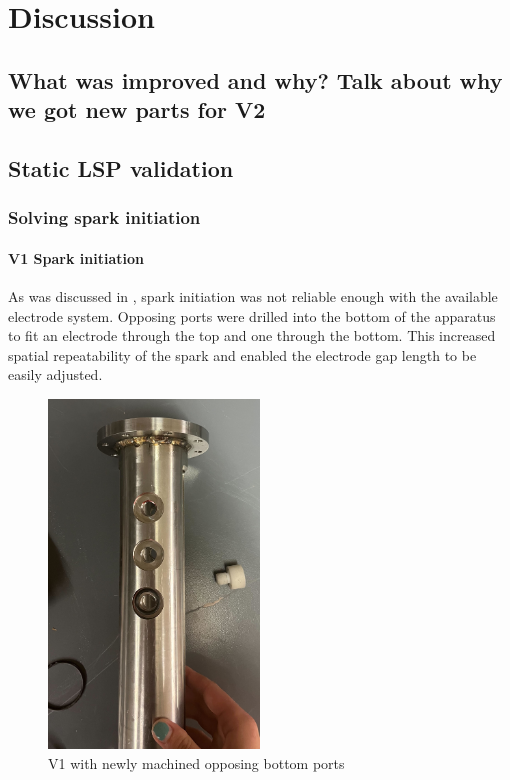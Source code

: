 \chapter{Discussion}

\section*{What was improved and why? Talk about why we got new parts for V2}

\section{Static LSP validation}

    \subsection{Solving spark initiation}

        \subsubsection{V1 Spark initiation}
            
            As was discussed in \textcite{duplayArgonLaserPlasmaThruster2024a}, spark initiation was not reliable enough with the available electrode system. Opposing ports were drilled into the bottom of the apparatus to fit an electrode through the top and one through the bottom. This increased spatial repeatability of the spark and enabled the electrode gap length to be easily adjusted.

            \begin{figure}[!ht]
                \centering
                \includegraphics[width=0.5\textwidth]{assets/5 discussion/Bottom ports machined.jpg}
                \caption{V1 with newly machined opposing bottom ports}
            \end{figure}

